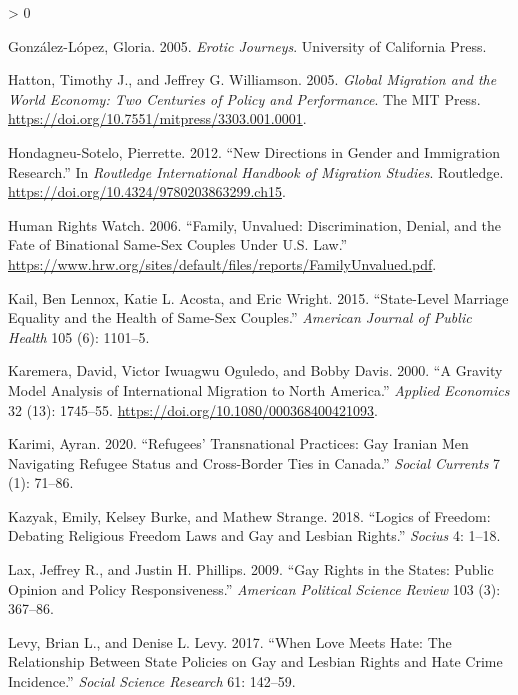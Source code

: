 \documentclass[
  11pt,
]{article}
\newlength{\cslhangindent}
\newenvironment{CSLReferences}[2] %
 {%
  \setlength{\parindent}{0pt}
  \ifodd #1 \everypar{\setlength{\hangindent}{\cslhangindent}}\ignorespaces\fi
  \ifnum #2 > 0
  \setlength{\parskip}{#2\baselineskip}
  \fi
 }%
 {}
\begin{document}
\begin{CSLReferences}{1}{0}
\leavevmode\hypertarget{ref-gonzalez-lopez_2005}{}%
González-López, Gloria. 2005. \emph{Erotic {Journeys}}. University of California Press.

\leavevmode\hypertarget{ref-hatton_2005a}{}%
Hatton, Timothy J., and Jeffrey G. Williamson. 2005. \emph{Global {Migration} and the {World} {Economy}: {Two} {Centuries} of {Policy} and {Performance}}. The MIT Press. \url{https://doi.org/10.7551/mitpress/3303.001.0001}.

\leavevmode\hypertarget{ref-hondagneu-sotelo_2012}{}%
Hondagneu-Sotelo, Pierrette. 2012. {``New Directions in Gender and Immigration Research.''} In \emph{Routledge {International} {Handbook} of {Migration} {Studies}}. Routledge. \url{https://doi.org/10.4324/9780203863299.ch15}.

\leavevmode\hypertarget{ref-humanrightswatch_2006}{}%
Human Rights Watch. 2006. {``Family, {Unvalued}: {Discrimination}, {Denial}, and the {Fate} of {Binational} {Same}-{Sex} {Couples} Under {U}.{S}. {Law}.''} \url{https://www.hrw.org/sites/default/files/reports/FamilyUnvalued.pdf}.

\leavevmode\hypertarget{ref-kail_2015}{}%
Kail, Ben Lennox, Katie L. Acosta, and Eric Wright. 2015. {``State-Level Marriage Equality and the Health of Same-Sex Couples.''} \emph{American Journal of Public Health} 105 (6): 1101--5.

\leavevmode\hypertarget{ref-karemera_2000}{}%
Karemera, David, Victor Iwuagwu Oguledo, and Bobby Davis. 2000. {``A Gravity Model Analysis of International Migration to {North} {America}.''} \emph{Applied Economics} 32 (13): 1745--55. \url{https://doi.org/10.1080/000368400421093}.

\leavevmode\hypertarget{ref-karimi_2020}{}%
Karimi, Ayran. 2020. {``Refugees' {Transnational} {Practices}: {Gay} {Iranian} {Men} {Navigating} {Refugee} {Status} and {Cross}-Border {Ties} in {Canada}.''} \emph{Social Currents} 7 (1): 71--86.

\leavevmode\hypertarget{ref-kazyak_2018}{}%
Kazyak, Emily, Kelsey Burke, and Mathew Strange. 2018. {``Logics of {Freedom}: {Debating} {Religious} {Freedom} {Laws} and {Gay} and {Lesbian} {Rights}.''} \emph{Socius} 4: 1--18.

\leavevmode\hypertarget{ref-lax_2009}{}%
Lax, Jeffrey R., and Justin H. Phillips. 2009. {``Gay Rights in the States: {Public} Opinion and Policy Responsiveness.''} \emph{American Political Science Review} 103 (3): 367--86.

\leavevmode\hypertarget{ref-levy_2017}{}%
Levy, Brian L., and Denise L. Levy. 2017. {``When {Love} {Meets} {Hate}: {The} {Relationship} {Between} {State} {Policies} on {Gay} and {Lesbian} {Rights} and {Hate} {Crime} {Incidence}.''} \emph{Social Science Research} 61: 142--59.


\end{CSLReferences}
\end{document}

